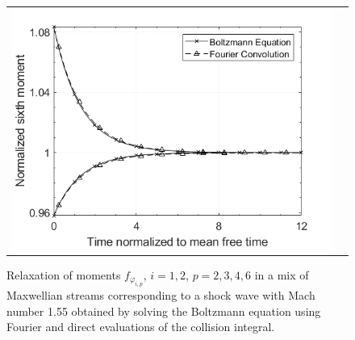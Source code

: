 \documentclass[12pt]{CSUNthesis}
\begin{document}
\begin{center}
\begin{figure}[h]
\begin{tabular}{@{}cc@{}}
  \includegraphics[height=.25\textheight]{images/reles_m155_5s15n_mom6.png}\\
  \end{tabular}
\caption{\label{fig03} Relaxation of moments $f_{\varphi_{i,p}}$, $i=1,2$, $p=2,3,4,6$ 
in a mix of Maxwellian streams corresponding to a shock wave with 
Mach number 1.55 obtained by solving the Boltzmann equation using Fourier and direct evaluations of the collision integral.}
\end{figure}
\end{center}


\clearpage
{}


\end{document}
